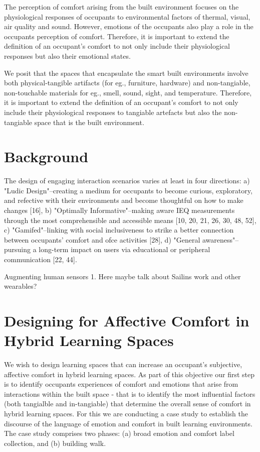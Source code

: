 \documentclass[acmconf, anonymous, review]{acmart}
\begin{document}
The perception of comfort arising from the built environment focuses on the physiological responses of occupants to environmental factors of thermal, visual, air quality and sound. However, emotions of the occupants also play a role in the occupants perception of comfort. Therefore, it is important to extend the definition of an occupant's comfort to not only include their physiological responses but also their emotional states.

We posit that the spaces that encapsulate the smart built environments involve both physical-tangible artifacts (for eg., furniture, hardware) and non-tangiable, non-touchable materials for eg., smell, sound, sight, and temperature. Therefore, it is important to extend the definition of an occupant's comfort to not only include their physiological responses to tangiable artefacts but also the non-tangiable space that is the built environment. 



\section{Background}

The design of engaging interaction scenarios varies at least in four directions: a) "Ludic Design"–creating a medium for occupants to become curious, exploratory, and refective with their environments and become thoughtful on how to
make changes [16], b) "Optimally Informative"–making aware IEQ
measurements through the most comprehensible and accessible
means [10, 20, 21, 26, 30, 48, 52], c) "Gamifed"–linking with social
inclusiveness to strike a better connection between occupants’ comfort and ofce activities [28], d) "General awareness"–pursuing a
long-term impact on users via educational or peripheral communication [22, 44].

Augmenting human sensors
1. Here maybe talk about Sailins work and other wearables?


\section{Designing for Affective Comfort in Hybrid Learning Spaces}


We wish to design learning spaces that can increase an occupant's subjective, affective comfort in hybrid learning spaces. As part of this objective our first step is to identify occupants experiences of comfort and emotions that arise from interactions within the built space - that is to identify the most influential factors (both tangialble and in-tangiable) that determine the overall sense of comfort in hybrid learning spaces. For this we are  conducting a case study to establish the discourse of the language of emotion and comfort in built learning environments. The case study comprises two phases: (a) broad emotion and comfort label collection, and (b) building walk. 
\end{document}
